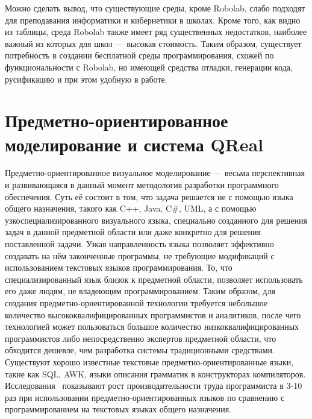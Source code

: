 \documentclass[a4paper]{article}
\begin{document}
Можно сделать вывод, что существующие среды, кроме Robolab, слабо подходят для преподавания информатики и кибернетики в школах. Кроме того, как видно из таблицы, среда Robolab также имеет ряд существенных недостатков, наиболее важный из которых для школ --- высокая стоимость. Таким образом, существует потребность в создании бесплатной среды программирования, схожей по функциональности с Robolab, но имеющей средства отладки, генерации кода, русификацию и при этом удобную в работе.

\section{Предметно-ориентированное моделирование и система QReal}
Предметно-ориентированное визуальное моделирование --- весьма перспективная и развивающаяся в данный момент методология разработки программного обеспечения. Суть её состоит в том, что задача решается не с помощью языка общего назначения, такого как C++, Java, C\#, UML, а с помощью узкоспециализированного визуального языка, специально созданного для решения задач в данной предметной области или даже конкретно для решения поставленной задачи. Узкая направленность языка позволяет эффективно создавать на нём законченные программы, не требующие модификаций с использованием текстовых языков программирования. То, что специализированный язык близок к предметной области, позволяет использовать его даже людям, не владеющим программированием. Таким образом, для создания предметно-ориентированной технологии требуется небольшое количество высококвалифицированных программистов и аналитиков, после чего технологией может пользоваться большое количество низкоквалифицированных программистов либо непосредственно экспертов предметной области, что обходится дешевле, чем разработка системы традиционными средствами. Существуют хорошо известные текстовые предметно-ориентированные языки, такие как SQL, AWK, языки описания грамматик в конструкторах компиляторов. Исследования~\cite{kelly, kieburtz, weiss} показывают рост производительности труда программиста в 3-10 раз при использовании предметно-ориентированных языков по сравнению с программированием на текстовых языках общего назначения.
\end{document}
